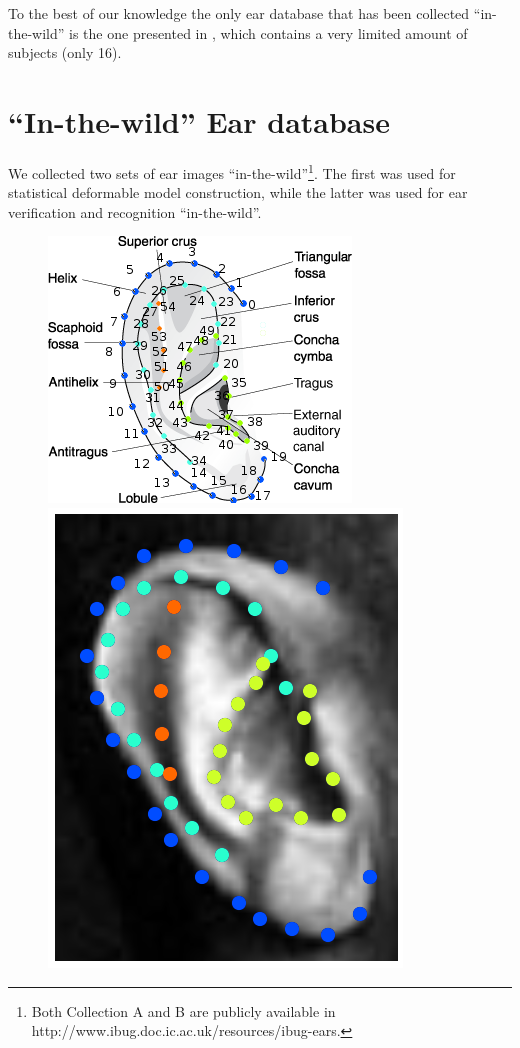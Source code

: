 To the best of our knowledge the only ear database that has been collected ``in-the-wild'' is the one presented in \cite{emervsivc2015ear}, which contains a very limited amount of subjects (only 16).

\section{``In-the-wild'' Ear database}
\label{label:ear_db}
We collected two sets of ear images ``in-the-wild''\footnote{\label{foot:annotations_ear}Both Collection A and B are publicly available in http://www.ibug.doc.ic.ac.uk/resources/ibug-ears.}. The first was used for  statistical deformable model construction, while the latter was used for ear verification and recognition ``in-the-wild''.

\begin{figure}[!b]
    \centering
    \includegraphics[width=0.9\columnwidth]{resources/Ear_Deformable_Model/pinna} \\
    \newcommand{\flowh}{0.22\columnwidth}
    \newcommand{\flowhhh}{0.21\columnwidth}
    \includegraphics[height=\flowh]{resources/Ear_Deformable_Model/dbs/db_1}

\end{figure}
